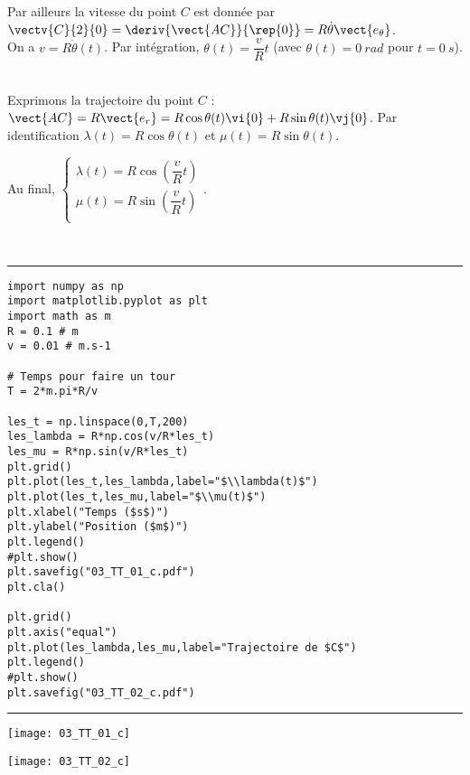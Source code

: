 
Par ailleurs la vitesse du point $C$ est donnée par $\vectv{C}{2}{0}=\deriv{\vect{AC}}{\rep{0}} = R\dot{\theta}\vect{e_\theta}$. 
\ifprof  ~\\
On a $v=R\dot{\theta}(t)$. Par intégration, $ \theta(t)=\dfrac{v}{R}t$ (avec $\theta(t)=\SI{0}{rad}$ pour $t=\SI{0}{s}$).

\else
\fi

\ifprof  ~\\
Exprimons la trajectoire du point $C$ : $\vect{AC}=R\vect{e_r} = R\cos\theta(t) \vi{0}+ R\sin\theta(t)  \vj{0}$. Par identification 
$ \lambda(t) = R\cos\theta(t)$ et $\mu(t) = R\sin\theta(t)$.

Au final, 
$\left\{
\begin{array}{l}
\lambda(t) = R\cos\left( \dfrac{v}{R}t\right)\\
\mu(t) = R\sin\left( \dfrac{v}{R}t\right)\\
\end{array}
\right.
$.

\else
\fi


\ifprof
~\\
\noindent\rule{\linewidth}{.1mm}
\begin{lstlisting}
import numpy as np
import matplotlib.pyplot as plt
import math as m
R = 0.1 # m
v = 0.01 # m.s-1 

# Temps pour faire un tour 
T = 2*m.pi*R/v

les_t = np.linspace(0,T,200)
les_lambda = R*np.cos(v/R*les_t)
les_mu = R*np.sin(v/R*les_t)
plt.grid()
plt.plot(les_t,les_lambda,label="$\\lambda(t)$")
plt.plot(les_t,les_mu,label="$\\mu(t)$")
plt.xlabel("Temps ($s$)")
plt.ylabel("Position ($m$)")
plt.legend()
#plt.show()
plt.savefig("03_TT_01_c.pdf")
plt.cla()

plt.grid()
plt.axis("equal")
plt.plot(les_lambda,les_mu,label="Trajectoire de $C$")
plt.legend()
#plt.show()
plt.savefig("03_TT_02_c.pdf")
\end{lstlisting}
\noindent\rule{\linewidth}{.1mm}

\begin{minipage}[c]{.45\linewidth}
\begin{center}
\texttt{[image: 03\_TT\_01\_c]}
\end{center}
\end{minipage} \hfill
\begin{minipage}[c]{.45\linewidth}
\begin{center}
\texttt{[image: 03\_TT\_02\_c]}
\end{center}
\end{minipage} 
\else
\fi
